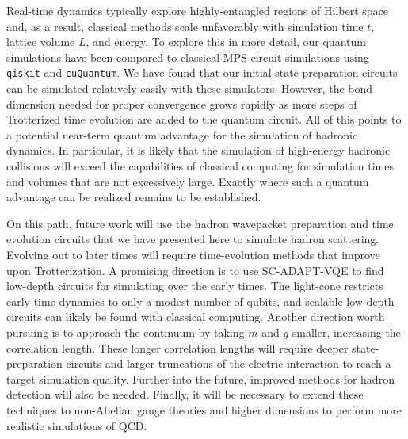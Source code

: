 \documentclass[aps, prc, tightenlines,superscriptaddress, letterpaper, amsmath, amssymb, preprintnumbers, floatfix, longbibliography, nofootinbib]{revtex4-2}
\begin{document}
Real-time dynamics typically explore highly-entangled regions of Hilbert space and, as a result, classical methods scale unfavorably with simulation time $t$, lattice volume $L$, and energy.
To explore this in more detail, our quantum simulations have been compared to classical MPS circuit simulations using {\tt qiskit} and {\tt cuQuantum}.
We have found that our initial state preparation circuits can be simulated relatively easily with these simulators.
However, the bond dimension needed for proper convergence grows rapidly as more steps of Trotterized time evolution are added to the quantum circuit.
All of this points to a potential near-term quantum advantage for the simulation of hadronic dynamics.
In particular, it is likely that the simulation of high-energy hadronic collisions will exceed the capabilities of classical computing for simulation times and volumes that are not excessively large.
Exactly where such a quantum advantage can be realized remains to be established.

On this path, future work will use the hadron wavepacket preparation and time evolution circuits that we have presented here to simulate hadron scattering. 
Evolving out to later times will require time-evolution methods that improve upon Trotterization.
A promising direction is to use SC-ADAPT-VQE to find low-depth circuits for simulating over the early times.
The light-cone restricts early-time dynamics to only a modest number of qubits, and scalable low-depth circuits can likely be found with classical computing.
Another direction worth pursuing  is to approach the continuum by taking $m$ and $g$ smaller, increasing the correlation length.
These longer correlation lengths will require deeper state-preparation circuits and larger truncations of the electric interaction to reach a target simulation quality.
Further into the future, improved methods for hadron detection will also be needed. 
Finally, it will be necessary to extend these techniques to non-Abelian gauge theories and higher dimensions to perform more realistic simulations of QCD.
\end{document}
